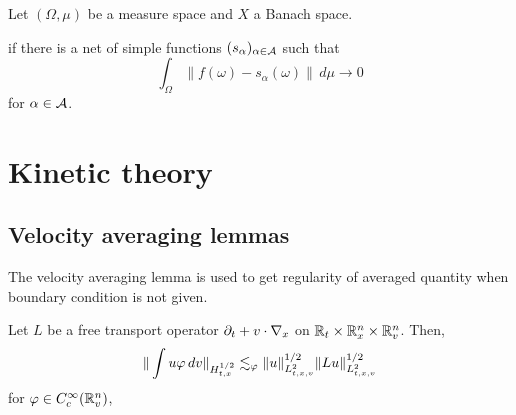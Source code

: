 \documentclass[12pt]{article}
\begin{document}
\begin{prb}
Let $(\Omega,\mu)$ be a measure space and $X$ a Banach space.

if there is a net of simple functions $(s_\alpha)_{\alpha\in\mathcal{A}}$ such that
\[\int_\Omega\|f(\omega)-s_\alpha(\omega)\|\,d\mu\to0\]
for $\alpha\in\mathcal{A}$.
\end{prb}



\section{Kinetic theory}
\subsection{Velocity averaging lemmas}
The velocity averaging lemma is used to get regularity of averaged quantity when boundary condition is not given.
\begin{thm}
Let $L$ be a free transport operator $\pd_t+v\cdot\nabla_x$ on $\mathbb{R}_t\times\mathbb{R}_x^n\times\mathbb{R}_v^n$.
Then,
\[\|\int u\varphi\,dv\|_{H_{t,x}^{1/2}}\lesssim_\varphi\|u\|_{L_{t,x,v}^2}^{1/2}\|Lu\|_{L_{t,x,v}^2}^{1/2}\]
for $\varphi\in C_c^\infty(\mathbb{R}_v^n)$,
\end{thm}
\end{document}
